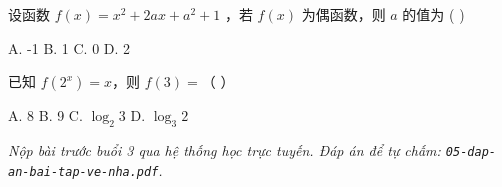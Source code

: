 \documentclass[11pt, a4paper]{article}
\begin{document}
\begin{baitap}[14]
设函数 $f(x) = x^2 + 2ax + a^2 + 1$ ，若 $f(x)$ 为偶函数，则 $a$ 的值为 ( )
\par\vspace{3pt}
\noindent A. -1 \quad B. 1 \quad C. 0 \quad D. 2
\end{baitap}

\begin{baitap}[15]
已知 $f(2^x) = x$，则 $f(3) =$（ ）
\par\vspace{3pt}
\noindent A. 8 \quad B. 9 \quad C. $\log_2 3$ \quad D. $\log_3 2$
\end{baitap}

\vspace{0.3cm}
\noindent\emph{Nộp bài trước buổi 3 qua hệ thống học trực tuyến. Đáp án để tự chấm: \texttt{05-dap-an-bai-tap-ve-nha.pdf}.}
\end{document}
